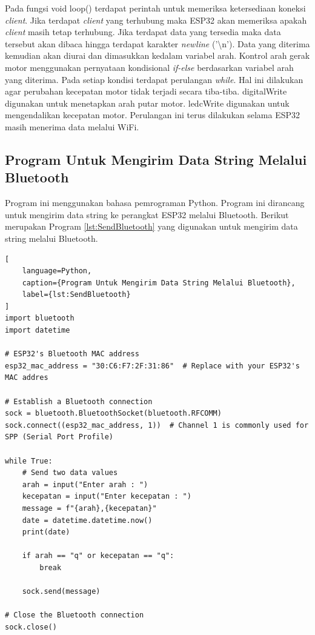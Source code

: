 Pada fungsi void loop() terdapat perintah untuk memeriksa ketersediaan koneksi \emph{client}. Jika terdapat \emph{client} yang terhubung maka ESP32 akan memeriksa apakah \emph{client} masih tetap terhubung. Jika terdapat data yang tersedia maka data tersebut akan dibaca hingga terdapat karakter \emph{newline} ('\textbackslash n'). Data yang diterima kemudian akan diurai dan dimasukkan kedalam variabel arah. Kontrol arah gerak motor menggunakan pernyataan kondisional \emph{if-else} berdasarkan variabel arah yang diterima. Pada setiap kondisi terdapat perulangan \emph{while}. Hal ini dilakukan agar perubahan kecepatan motor tidak terjadi secara tiba-tiba. digitalWrite digunakan untuk menetapkan arah putar motor. ledcWrite digunakan untuk mengendalikan kecepatan motor. Perulangan ini terus dilakukan selama ESP32 masih menerima data melalui WiFi.

\subsection{Program Untuk Mengirim Data String Melalui Bluetooth}

Program ini menggunakan bahasa pemrograman Python. Program ini dirancang untuk mengirim data string ke perangkat ESP32 melalui Bluetooth. Berikut merupakan Program \ref{lst:SendBluetooth} yang digunakan untuk mengirim data string melalui Bluetooth.

\begin{lstlisting}[
    language=Python,
    caption={Program Untuk Mengirim Data String Melalui Bluetooth},
    label={lst:SendBluetooth}
]
import bluetooth
import datetime

# ESP32's Bluetooth MAC address
esp32_mac_address = "30:C6:F7:2F:31:86"  # Replace with your ESP32's MAC addres

# Establish a Bluetooth connection
sock = bluetooth.BluetoothSocket(bluetooth.RFCOMM)
sock.connect((esp32_mac_address, 1))  # Channel 1 is commonly used for SPP (Serial Port Profile)

while True:
    # Send two data values
    arah = input("Enter arah : ")
    kecepatan = input("Enter kecepatan : ")
    message = f"{arah},{kecepatan}"
    date = datetime.datetime.now()
    print(date)
    
    if arah == "q" or kecepatan == "q":
        break
    
    sock.send(message)

# Close the Bluetooth connection
sock.close()

\end{lstlisting}

